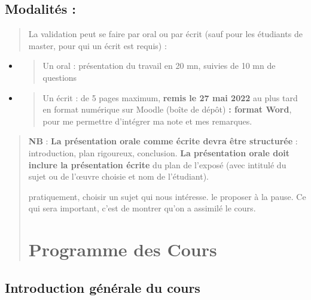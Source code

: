 \hypertarget{modalituxe9s}{%
\subsection{Modalités :}\label{modalituxe9s}}

\begin{quote}
La validation peut se faire par oral ou par écrit (sauf pour les
étudiants de master, pour qui un écrit est requis) :
\end{quote}

\begin{itemize}
\item
  \begin{quote}
  Un oral : présentation du travail en 20 mn, suivies de 10 mn de
  questions
  \end{quote}
\item
  \begin{quote}
  Un écrit : de 5 pages maximum, \textbf{remis le 27 mai 2022} au plus
  tard en format numérique sur Moodle (boîte de dépôt) \textbf{: format
  Word}, pour me permettre d'intégrer ma note et mes remarques.
  \end{quote}
\end{itemize}

\begin{quote}
\textbf{NB} : \textbf{La présentation orale comme écrite devra être
structurée} : introduction, plan rigoureux, conclusion. \textbf{La
présentation orale doit inclure la présentation écrite} du plan de
l'exposé (avec intitulé du sujet ou de l'œuvre choisie et nom de
l'étudiant).



pratiquement, choisir un sujet qui nous intéresse. le proposer à la pause.
Ce qui sera important, c'est de montrer qu'on a assimilé le cours.


\section{Programme des Cours}
\end{quote}

 
 

\hypertarget{introduction-guxe9nuxe9rale-du-cours}{%
\subsection{Introduction générale du
cours}\label{introduction-guxe9nuxe9rale-du-cours}}

